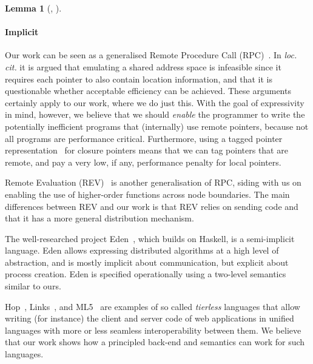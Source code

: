 \documentclass{article}
\theoremstyle{definition}
\newtheorem{lemma}[theorem]{Lemma}
\newcommand{\Conid}[1]{\mathit{#1}}
\newcommand{\Varid}[1]{\mathit{#1}}
\renewcommand\Varid[1]{\mathord{\textsf{#1}}}
\let\Conid\Varid
\renewcommand\Varid[1]{\textsf{#1}}
\begin{document}
\begin{lemma}[{\textsmaller[.5]{\ensuremath{\Conid{HeapUpdate.env}}}}, {\textsmaller[.5]{\ensuremath{\Conid{HeapUpdate.stack}}}}]
\paragraph*{Implicit}
Our work can be seen as a generalised Remote Procedure
Call (RPC)~\cite{DBLP:journals/tocs/BirrelN84}.  In \emph{loc. cit.} it is argued
that emulating a shared address space is infeasible since it requires each
pointer to also contain location information, and that it is questionable
whether acceptable efficiency can be achieved.  These arguments certainly apply
to our work, where we do just this. With the goal of expressivity in mind,
however, we believe that we should \emph{enable} the programmer to write the
potentially inefficient programs that (internally) use remote pointers, because
not all programs are performance critical. Furthermore, using a tagged pointer
representation~\cite{DBLP:conf/icfp/MarlowYJ07} for closure pointers means that
we can tag pointers that are remote, and pay a very low, if any, performance
penalty for local pointers.

Remote Evaluation (REV)~\cite{DBLP:journals/toplas/StamosG90} is another
generalisation of RPC, siding with us on enabling the use of
higher-order functions across node boundaries. The main differences between REV
and our work is that REV relies on sending code and that it has a more general
distribution mechanism.

The well-researched project Eden~\cite{DBLP:journals/jfp/LoogenOP05}, which
builds on Haskell, is a semi-implicit language. Eden allows expressing
distributed algorithms at a high level of abstraction, and is mostly implicit
about communication, but explicit about process creation. Eden is specified
operationally using a two-level semantics similar to ours.

Hop~\cite{DBLP:conf/oopsla/SerranoGL06}, Links~\cite{DBLP:conf/fmco/CooperLWY06},
and ML5~\cite{DBLP:conf/tgc/VIICH07}
are examples of so called
\emph{tierless} languages that allow writing (for instance) the client and
server code of web applications in unified languages with more or less
seamless interoperability between them. We believe that our work shows
how a principled back-end and semantics can work for such languages.



\end{lemma}
\end{document}
